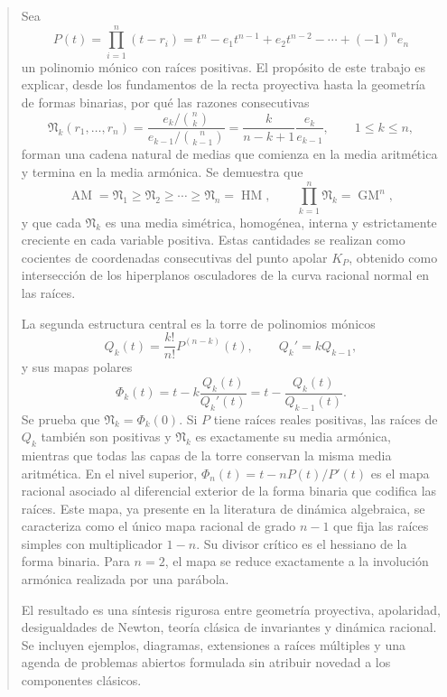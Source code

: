 \documentclass[11pt,oneside]{scrartcl}
\theoremstyle{plainblue}
\theoremstyle{definitionblue}
\theoremstyle{remarkgray}
\newcommand{\AM}{\operatorname{AM}}
\newcommand{\GM}{\operatorname{GM}}
\newcommand{\HM}{\operatorname{HM}}
\newcommand{\cN}{\mathfrak{N}}
\begin{document}
\begin{abstract}
Sea
\[
P(t)=\prod_{i=1}^{n}(t-r_i)
=t^n-e_1t^{n-1}+e_2t^{n-2}-\cdots+(-1)^ne_n
\]
un polinomio mónico con raíces positivas. El propósito de este trabajo es explicar,
desde los fundamentos de la recta proyectiva hasta la geometría de formas binarias,
por qué las razones consecutivas
\[
\cN_k(r_1,\dots,r_n)
=\frac{e_k/\binom nk}{e_{k-1}/\binom n{k-1}}
=\frac{k}{n-k+1}\frac{e_k}{e_{k-1}},
\qquad 1\le k\le n,
\]
forman una cadena natural de medias que comienza en la media aritmética y termina
en la media armónica. Se demuestra que
\[
\AM=\cN_1\ge \cN_2\ge\cdots\ge\cN_n=\HM,
\qquad
\prod_{k=1}^{n}\cN_k=\GM^n,
\]
y que cada \(\cN_k\) es una media simétrica, homogénea, interna y estrictamente
creciente en cada variable positiva. Estas cantidades se realizan como cocientes de
coordenadas consecutivas del punto apolar \(K_P\), obtenido como intersección de los
hiperplanos osculadores de la curva racional normal en las raíces.

La segunda estructura central es la torre de polinomios mónicos
\[
Q_k(t)=\frac{k!}{n!}P^{(n-k)}(t),\qquad Q_k'=kQ_{k-1},
\]
y sus mapas polares
\[
\Phi_k(t)=t-k\frac{Q_k(t)}{Q_k'(t)}
=t-\frac{Q_k(t)}{Q_{k-1}(t)}.
\]
Se prueba que \(\cN_k=\Phi_k(0)\). Si \(P\) tiene raíces reales positivas, las
raíces de \(Q_k\) también son positivas y
\(\cN_k\) es exactamente su media armónica, mientras que todas las capas de la
torre conservan la misma media aritmética. En el nivel superior,
\(\Phi_n(t)=t-nP(t)/P'(t)\) es el mapa racional asociado al diferencial exterior de
la forma binaria que codifica las raíces. Este mapa, ya presente en la literatura de
dinámica algebraica, se caracteriza como el único mapa racional de grado \(n-1\)
que fija las raíces simples con multiplicador \(1-n\). Su divisor crítico es el
hessiano de la forma binaria. Para \(n=2\), el mapa se reduce exactamente a la
involución armónica realizada por una parábola.

El resultado es una síntesis rigurosa entre geometría proyectiva, apolaridad,
desigualdades de Newton, teoría clásica de invariantes y dinámica racional. Se
incluyen ejemplos, diagramas, extensiones a raíces múltiples y una agenda de
problemas abiertos formulada sin atribuir novedad a los componentes clásicos.
\end{abstract}
\end{document}
